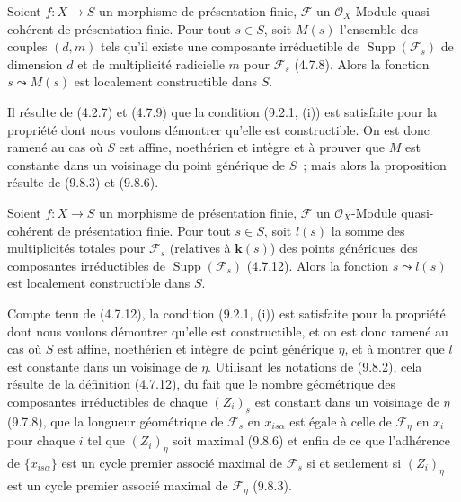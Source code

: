 
\begin{corollary}[9.8.7]
\label{IV.9.8.7-fr}
Soient $f:X\to S$ un morphisme de présentation finie, $\mathcal F$ un
$\mathcal O_X$-Module quasi-cohérent de présentation finie. Pour tout $s\in S$,
soit $M(s)$ l'ensemble des couples $(d,m)$ tels qu'il existe une composante
irréductible de $\operatorname{Supp}(\mathcal F_s)$ de dimension $d$ et de
multiplicité radicielle $m$ pour $\mathcal F_s$ \textup{(4.7.8)}. Alors la fonction
$s\leadsto M(s)$ est localement constructible dans $S$.
\end{corollary}

Il résulte de (4.2.7) et (4.7.9) que la condition (9.2.1, (i)) est satisfaite
pour la propriété dont nous voulons démontrer qu'elle est constructible. On est
donc ramené au cas où $S$ est affine, noethérien et intègre et à prouver que $M$
est constante dans un voisinage du point générique de $S$~; mais alors la
proposition résulte de (9.8.3) et (9.8.6).

\begin{proposition}[9.8.8]
\label{IV.9.8.8-fr}
Soient $f:X\to S$ un morphisme de présentation finie, $\mathcal F$ un
$\mathcal O_X$-Module quasi-cohérent de présentation finie. Pour tout $s\in S$,
soit $l(s)$ la somme des multiplicités totales pour $\mathcal F_s$ (relatives à
$\boldsymbol{k}(s)$) des points génériques des composantes irréductibles de
$\operatorname{Supp}(\mathcal F_s)$ \textup{(4.7.12)}. Alors la fonction $s\leadsto l(s)$
est localement constructible dans $S$.
\end{proposition}

Compte tenu de (4.7.12), la condition (9.2.1, (i)) est satisfaite pour la
propriété dont nous voulons démontrer qu'elle est constructible, et on est donc
ramené au cas où $S$ est affine, noethérien et intègre de point générique
$\eta$, et à montrer que $l$ est constante dans un voisinage de $\eta$.
Utilisant les notations de (9.8.2), cela résulte de la définition (4.7.12), du
fait que le nombre géométrique des composantes irréductibles de chaque
$(Z_i)_s$ est constant dans un voisinage de $\eta$ (9.7.8), que la longueur
géométrique de $\mathcal F_s$ en $x_{is\alpha}$ est égale à celle de
$\mathcal F_\eta$ en $x_i$ pour chaque $i$ tel que $(Z_i)_\eta$ soit maximal
(9.8.6) et enfin de ce que l'adhérence de $\{x_{is\alpha}\}$ est un cycle
premier associé maximal de $\mathcal F_s$ si et seulement si $(Z_i)_\eta$ est
un cycle premier associé maximal de $\mathcal F_\eta$ (9.8.3).

